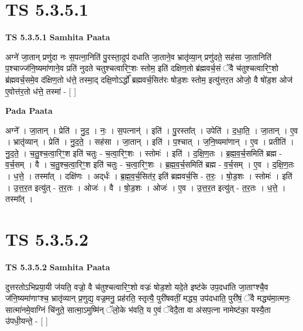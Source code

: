 \documentclass[17pt]{extarticle}
\begin{document}
\section*{ TS 5.3.5.1 }

\textbf{TS 5.3.5.1 } \newline
\textbf{Samhita Paata} \newline

अग्ने॑ जा॒तान् प्रणु॑दा नः स॒पत्ना॒निति॑ पु॒रस्ता॒दुप॑ दधाति जा॒ताने॒व भ्रातृ॑व्या॒न् प्रणु॑दते॒ सह॑सा जा॒तानिति॑ प॒श्चाज्ज॑नि॒ष्यमा॑णाने॒व प्रति॑ नुदते चतुश्चत्वारिꣳ॒॒शः स्तोम॒ इति॑ दक्षिण॒तो ब्र॑ह्मवर्च॒सं ॅवै च॑तुश्चत्वारिꣳ॒॒शो ब्र॑ह्मवर्च॒समे॒व द॑क्षिण॒तो ध॑त्ते॒ तस्मा॒द् दक्षि॒णोऽर्द्धो᳚ ब्रह्मवर्च॒सित॑रः षोड॒शः स्तोम॒ इत्यु॑त्तर॒त ओजो॒ वै षो॑ड॒श ओज॑ ए॒वोत्त॑र॒तो ध॑त्ते॒ तस्मा॑ - [  ] \newline

\textbf{Pada Paata} \newline

अग्ने᳚ । जा॒तान् । प्रेति॑ । नु॒द॒ । नः॒ । स॒पत्नान्॑ । इति॑ । पु॒रस्ता᳚त् । उपेति॑ । द॒धा॒ति॒ । जा॒तान् । ए॒व । भ्रातृ॑व्यान् । प्रेति॑ । नु॒द॒ते॒ । सह॑सा । जा॒तान् । इति॑ । प॒श्चात् । ज॒नि॒ष्यमा॑णान् । ए॒व । प्रतीति॑ । नु॒द॒ते॒ । च॒तु॒श्च॒त्वा॒रिꣳ॒॒श इति॑ चतुः - च॒त्वा॒रिꣳ॒॒शः । स्तोमः॑ । इति॑ । द॒क्षि॒ण॒तः । ब्र॒ह्म॒व॒र्च॒समिति॑ ब्रह्म - व॒र्च॒सम् । वै । च॒तु॒श्च॒त्वा॒रिꣳ॒॒श इति॑ चतुः - च॒त्वा॒रिꣳ॒॒शः । ब्र॒ह्म॒व॒र्च॒समिति॑ ब्रह्म - व॒र्च॒सम् । ए॒व । द॒क्षि॒ण॒तः । ध॒त्ते॒ । तस्मा᳚त् । दक्षि॑णः । अद्‌र्धः॑ । ब्र॒ह्म॒व॒र्च॒सित॑र॒ इति॑ ब्रह्मवर्च॒सि - त॒रः॒ । षो॒ड॒शः । स्तोमः॑ । इति॑ । उ॒त्त॒र॒त इत्यु॑त् - त॒र॒तः । ओजः॑ । वै । षो॒ड॒शः । ओजः॑ । ए॒व । उ॒त्त॒र॒त इत्यु॑त् - त॒र॒तः । ध॒त्ते॒ । तस्मा᳚त् ।  \newline




\section*{ TS 5.3.5.2 }

\textbf{TS 5.3.5.2 } \newline
\textbf{Samhita Paata} \newline

दुत्तरतोऽभिप्रया॒यी ज॑यति॒ वज्रो॒ वै च॑तुश्चत्वारिꣳ॒॒शो वज्रः॑ षोड॒शो यदे॒ते इष्ट॑के उप॒दधा॑ति जा॒ताꣳश्चै॒व ज॑नि॒ष्यमा॑णाꣳश्च॒ भ्रातृ॑व्यान् प्र॒णुद्य॒ वज्र॒मनु॒ प्रह॑रति॒ स्तृत्यै॒ पुरी॑षवतीं॒ मद्ध्य॒ उप॑दधाति॒ पुरी॑षं॒ ॅवै मद्ध्य॑मा॒त्मनः॒ सात्मा॑नमे॒वाग्निं चि॑नुते॒ सात्मा॒ऽमुष्मि॑न् ॅलो॒के भ॑वति॒ य ए॒वं ॅवेदै॒ता वा अ॑सप॒त्ना नामेष्ट॑का॒ यस्यै॒ता उ॑पधी॒यन्ते॒ - [  ] \newline
\end{document}
